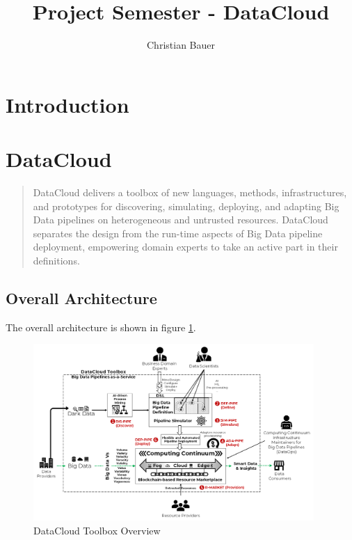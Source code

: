 \documentclass{article}
\title{Project Semester - DataCloud}
\author{Christian Bauer}
\begin{document}
    \maketitle

    \tableofcontents
    \lstlistoflistings
    \pagebreak

    \section{Introduction}

    \section{DataCloud}

        \begin{quote}
            DataCloud delivers a toolbox of new languages, methods, infrastructures, and prototypes for discovering, simulating, deploying, and adapting Big Data pipelines on heterogeneous and untrusted resources. DataCloud separates the design from the run-time aspects of Big Data pipeline deployment, empowering domain experts to take an active part in their definitions. \cite{datacloudAbout}
        \end{quote}

        \subsection{Overall Architecture}

            The overall architecture is shown in figure \ref{fig:datacloud-toolbox-overview}.

            \begin{figure}[h!]
                \centering
                \includegraphics[width=0.95\textwidth]{figures/datacloud_toolbox.png}
                \caption{DataCloud Toolbox Overview \cite{datacloudToolbox}}
                \label{fig:datacloud-toolbox-overview}
            \end{figure}
            
\end{document}
